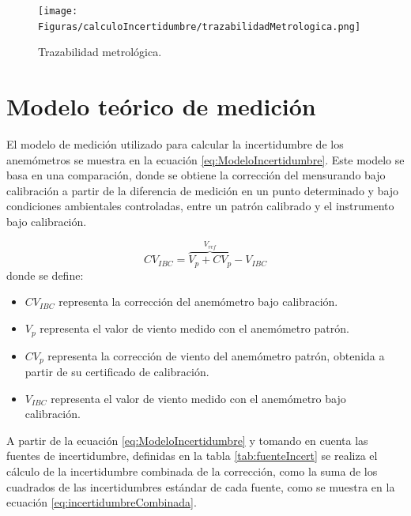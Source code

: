 \begin{figure}[H]
    \centering
    \texttt{[image: Figuras/calculoIncertidumbre/trazabilidadMetrologica.png]}
    \caption{Trazabilidad metrológica. \cite{instrumentosMedicionesFiuba}}
    \label{fig:trazabilidadMetrologica}
\end{figure}


\section{Modelo teórico de medición}\label{sec:modelo_teoricos}

El modelo de medición utilizado para calcular la incertidumbre de los anemómetros se muestra en la ecuación \ref{eq:ModeloIncertidumbre}. Este modelo se basa en una comparación, donde se obtiene la corrección del mensurando bajo calibración a partir de la diferencia de medición en un punto determinado y bajo condiciones ambientales controladas, entre un patrón calibrado y el instrumento bajo calibración.

\begin{equation}
    CV_{IBC} = \overbrace{V_{p} + CV_{p}}^{V_{ref}} - V_{IBC}
    \label{eq:ModeloIncertidumbre}
\end{equation}
donde se define:

\begin{itemize}
    \item $CV_{IBC}$ representa la corrección del anemómetro bajo calibración.   
    \item $V_{p}$ representa el valor de viento medido con el anemómetro patrón.
    \item $CV_{p}$ representa la corrección de viento del anemómetro patrón, obtenida a partir de su certificado de calibración.
    \item $V_{IBC}$ representa el valor de viento medido con el anemómetro bajo calibración.
\end{itemize}

A partir de la ecuación \ref{eq:ModeloIncertidumbre} y tomando en cuenta las fuentes de incertidumbre, definidas en la tabla \ref{tab:fuenteIncert} se realiza el cálculo de la incertidumbre combinada de la corrección, como la suma de los cuadrados de las incertidumbres estándar de cada fuente, como se muestra en la ecuación \ref{eq:incertidumbreCombinada}.

